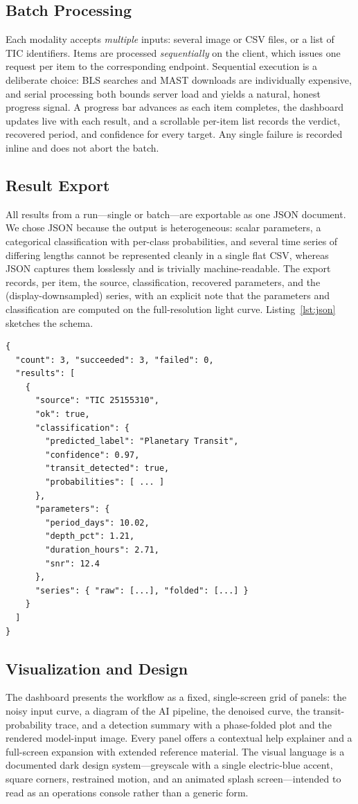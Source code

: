 \documentclass[twocolumn,10pt]{article}
\begin{document}
\subsection{Batch Processing}
Each modality accepts \emph{multiple} inputs: several image or CSV files, or a list
of TIC identifiers. Items are processed \emph{sequentially} on the client, which
issues one request per item to the corresponding endpoint. Sequential execution is
a deliberate choice: BLS searches and MAST downloads are individually expensive,
and serial processing both bounds server load and yields a natural, honest
progress signal. A progress bar advances as each item completes, the dashboard
updates live with each result, and a scrollable per-item list records the verdict,
recovered period, and confidence for every target. Any single failure is recorded
inline and does not abort the batch.

\subsection{Result Export}
All results from a run---single or batch---are exportable as one JSON document.
We chose JSON because the output is heterogeneous: scalar parameters, a categorical
classification with per-class probabilities, and several time series of differing
lengths cannot be represented cleanly in a single flat CSV, whereas JSON captures
them losslessly and is trivially machine-readable. The export records, per item,
the source, classification, recovered parameters, and the (display-downsampled)
series, with an explicit note that the parameters and classification are computed
on the full-resolution light curve. Listing~\ref{lst:json} sketches the schema.

\begin{lstlisting}[caption={Abbreviated result-export schema.},label={lst:json}]
{
  "count": 3, "succeeded": 3, "failed": 0,
  "results": [
    {
      "source": "TIC 25155310",
      "ok": true,
      "classification": {
        "predicted_label": "Planetary Transit",
        "confidence": 0.97,
        "transit_detected": true,
        "probabilities": [ ... ]
      },
      "parameters": {
        "period_days": 10.02,
        "depth_pct": 1.21,
        "duration_hours": 2.71,
        "snr": 12.4
      },
      "series": { "raw": [...], "folded": [...] }
    }
  ]
}
\end{lstlisting}

\subsection{Visualization and Design}
The dashboard presents the workflow as a fixed, single-screen grid of panels: the
noisy input curve, a diagram of the AI pipeline, the denoised curve, the
transit-probability trace, and a detection summary with a phase-folded plot and the
rendered model-input image. Every panel offers a contextual help explainer and a
full-screen expansion with extended reference material. The visual language is a
documented dark design system---greyscale with a single electric-blue accent,
square corners, restrained motion, and an animated splash screen---intended to
read as an operations console rather than a generic form.
\end{document}
